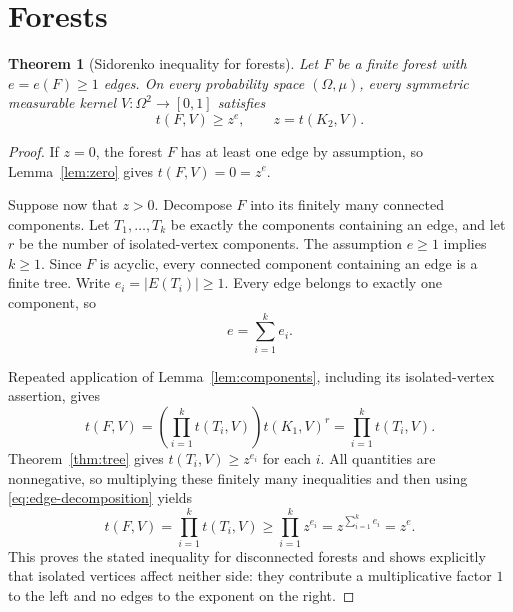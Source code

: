 \documentclass[11pt]{article}
\newtheorem{theorem}{Theorem}[section]
\begin{document}
\section{Forests}

\begin{theorem}[Sidorenko inequality for forests]
\label{thm:forest}
Let $F$ be a finite forest with $e=e(F)\geq1$ edges.  On every
probability space $(\Omega,\mu)$, every symmetric measurable kernel
$V\colon\Omega^2\to[0,1]$ satisfies
\[
\boxed{t(F,V)\geq z^e,\qquad z=t(K_2,V).}
\]
\end{theorem}

\begin{proof}
If $z=0$, the forest $F$ has at least one edge by assumption, so
Lemma~\ref{lem:zero} gives $t(F,V)=0=z^e$.

Suppose now that $z>0$.  Decompose $F$ into its finitely many connected
components.  Let $T_1,\ldots,T_k$ be exactly the components containing
an edge, and let $r$ be the number of isolated-vertex components.  The
assumption $e\geq1$ implies $k\geq1$.  Since $F$ is acyclic, every
connected component containing an edge is a finite tree.  Write
$e_i=|E(T_i)|\geq1$.  Every edge belongs to exactly one component, so
\begin{equation}
e=\sum_{i=1}^k e_i.
\label{eq:edge-decomposition}
\end{equation}

Repeated application of Lemma~\ref{lem:components}, including its
isolated-vertex assertion, gives
\begin{equation}
t(F,V)=\left(\prod_{i=1}^k t(T_i,V)\right)t(K_1,V)^r
=\prod_{i=1}^k t(T_i,V).
\label{eq:forest-factorization}
\end{equation}
Theorem~\ref{thm:tree} gives $t(T_i,V)\geq z^{e_i}$ for each $i$.
All quantities are nonnegative, so multiplying these finitely many
inequalities and then using \eqref{eq:edge-decomposition} yields
\[
t(F,V)
=\prod_{i=1}^k t(T_i,V)
\geq\prod_{i=1}^k z^{e_i}
=z^{\sum_{i=1}^k e_i}
=z^e.
\]
This proves the stated inequality for disconnected forests and shows
explicitly that isolated vertices affect neither side: they contribute
a multiplicative factor $1$ to the left and no edges to the exponent on
the right.
\end{proof}


\end{document}
